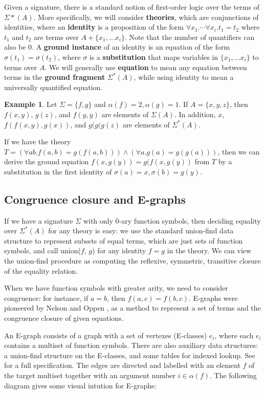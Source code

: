 \documentclass{article}
\theoremstyle{definition}
\newtheorem*{ex}{Example}
\begin{document}
Given a signature, there is a standard notion of first-order logic over the terms of $\Sigma*(A)$. More specifically, we will consider \textbf{theories}, which are conjunctions of identities, where an \textbf{identity} is a proposition of the form $\forall x_1. \dotsi \forall x_i. t_1 = t_2$ where $t_1$ and $t_2$ are terms over $A + \{x_1, \dotsc x_i\}$. Note that the number of quantifiers can also be 0.
A \textbf{ground instance} of an identity is an equation of the form $\sigma(t_1) = \sigma(t_2)$, where $\sigma$ is a \textbf{substitution} that maps variables in $\{x_1, \dotsc x_i\}$ to terms over $A$. We will generally use \textbf{equation} to mean any equation between terms in the \textbf{ground fragment} $\Sigma^*(A)$, while using identity to mean a universally quantified equation.

\begin{ex}
Let $\Sigma = \{f, g\}$ and $\alpha(f) = 2, \alpha(g) = 1$. If $A = \{x, y, z\}$, then $f(x, y)$, $g(z)$, and $f(y, y)$ are elements of $\Sigma(A)$. In addition, $x$, $f(f(x, y), g(x))$, and $g(g(g(z)$ are elements of $\Sigma^*(A)$.

If we have the theory $T = (\forall a b. f(a, b) = g(f(a, b))) \wedge (\forall a. g(a) = g(g(a)))$, then we can derive the ground equation $f(x, g(y)) = g(f(x, g(y))$ from $T$ by a substitution in the first identity of $\sigma(a) = x, \sigma(b) = g(y)$.
\end{ex}

\subsection{Congruence closure and E-graphs}
If we have a signature $\Sigma$ with only 0-ary function symbols, then deciding equality over
$\Sigma^*(A)$ for any theory is easy: we use the standard union-find data structure to represent subsets of equal terms, which are just sets of function symbols, and call union($f$, $g$) for any identity $f = g$ in the theory. We can view the union-find procedure as computing the reflexive, symmetric, transitive closure of the equality relation.

When we have function symbols with greater arity, we need to consider congruence: for instance, if $a = b$, then $f(a, c) = f(b, c)$. E-graphs were pioneered by Nelson and Oppen \cite{nelson1980fast}, as a method to represent a set of terms and the congruence closure of given equations.

An E-graph consists of a graph with a set of vertexes (E-classes) $e_i$, where each $e_i$ contains a multiset of function symbols. There are also auxiliary data structures: a union-find structure on the E-classes, and some tables for indexed lookup. See \citep{willsey2021egg} for a full specification. The edges are directed and labelled with an element $f$ of the target multiset together with an argument number $i \in \alpha(f)$. The following diagram gives some visual intution for E-graphs:
\end{document}
